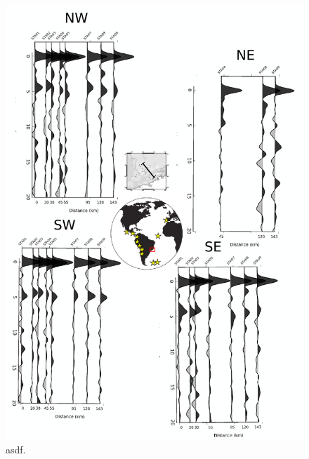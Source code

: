 \begin{figure}[!ht]
\centering
\includegraphics[scale=0.5]{Figs/RF_azimute_perfil1.png}
\caption{asdf.}
\label{RF_perfil1}
\end{figure}


